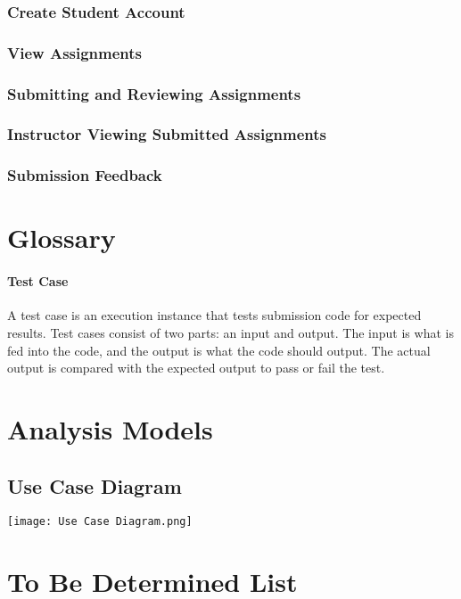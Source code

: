 \documentclass{article}
\begin{document}
\subsubsection{Create Student Account}

\subsubsection{View Assignments}

\subsubsection{Submitting and Reviewing Assignments}

\subsubsection{Instructor Viewing Submitted Assignments}

\subsubsection{Submission Feedback}


\newpage
\appendix


\section{Glossary}

\paragraph{Test Case} A test case is an execution instance that tests submission code for expected results. Test cases consist of two parts: an input and output. The input is what is fed into the code, and the output is what the code should output. The actual output is compared with the expected output to pass or fail the test.


\newpage
\section{Analysis Models}
\subsection{Use Case Diagram}
\texttt{[image: Use Case Diagram.png]}

\newpage
\section{To Be Determined List}
\end{document}
